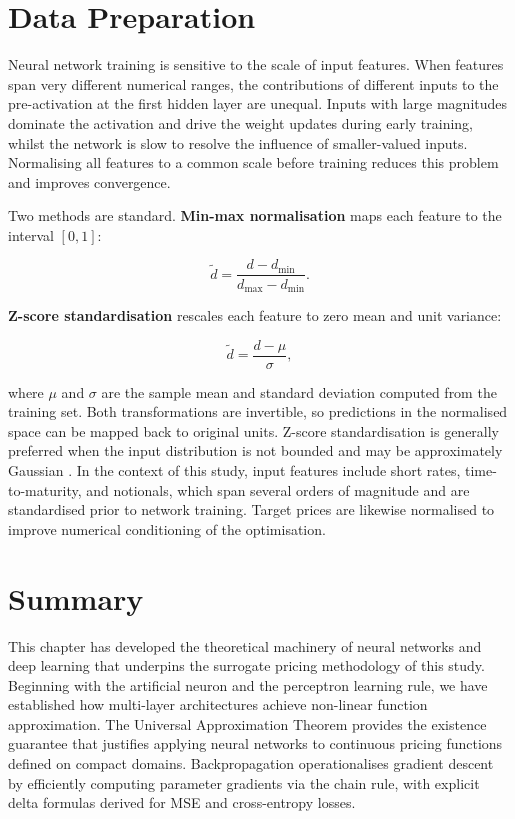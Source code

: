     \section*{Data Preparation}

    Neural network training is sensitive to the scale of input features. When features
    span very different numerical ranges, the contributions of different inputs to the
    pre-activation at the first hidden layer are unequal. Inputs with large magnitudes
    dominate the activation and drive the weight updates during early training, whilst
    the network is slow to resolve the influence of smaller-valued inputs. Normalising
    all features to a common scale before training reduces this problem and improves
    convergence.

    Two methods are standard. \textbf{Min-max normalisation} maps each feature to
    the interval $[0, 1]$:

    \[
    \tilde{d} = \frac{d - d_{\min}}{d_{\max} - d_{\min}}.
    \]

    \textbf{Z-score standardisation} rescales each feature to zero mean and unit
    variance:

    \[
    \tilde{d} = \frac{d - \mu}{\sigma},
    \]

    where $\mu$ and $\sigma$ are the sample mean and standard deviation computed from
    the training set. Both transformations are invertible, so predictions in the
    normalised space can be mapped back to original units. Z-score standardisation
    is generally preferred when the input distribution is not bounded and may be
    approximately Gaussian \citep{goodfellow2016deep}. In the context of this study,
    input features include short rates, time-to-maturity, and notionals, which span
    several orders of magnitude and are standardised prior to network training. Target
    prices are likewise normalised to improve numerical conditioning of the
    optimisation.

    \section*{Summary}

    This chapter has developed the theoretical machinery of neural networks and deep
    learning that underpins the surrogate pricing methodology of this study. Beginning
    with the artificial neuron and the perceptron learning rule, we have established how
    multi-layer architectures achieve non-linear function approximation. The Universal
    Approximation Theorem provides the existence guarantee that justifies applying
    neural networks to continuous pricing functions defined on compact domains.
    Backpropagation operationalises gradient descent by efficiently computing parameter
    gradients via the chain rule, with explicit delta formulas derived for MSE and
    cross-entropy losses.

